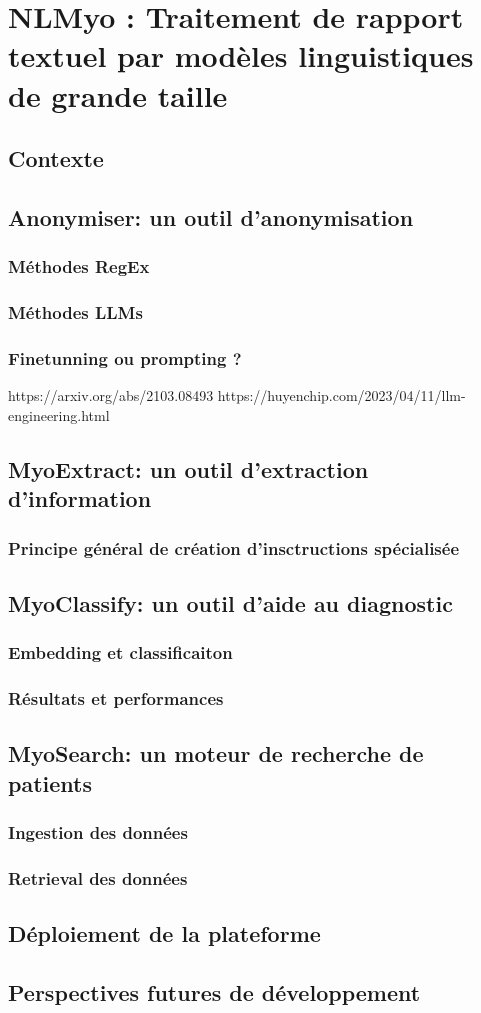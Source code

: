 \chapter{NLMyo : Traitement de rapport textuel par modèles linguistiques de grande taille}

\section{Contexte}
\section{Anonymiser: un outil d'anonymisation}
\subsection{Méthodes RegEx}
\subsection{Méthodes LLMs}
\subsection{Finetunning ou prompting ?}
https://arxiv.org/abs/2103.08493
https://huyenchip.com/2023/04/11/llm-engineering.html
\section{MyoExtract: un outil d'extraction d'information}
\subsection{Principe général de création d'insctructions spécialisée}
\section{MyoClassify: un outil d'aide au diagnostic}
\subsection{Embedding et classificaiton}
\subsection{Résultats et performances}
\section{MyoSearch: un moteur de recherche de patients}
\subsection{Ingestion des données}
\subsection{Retrieval des données}
\section{Déploiement de la plateforme}
\section{Perspectives futures de développement}